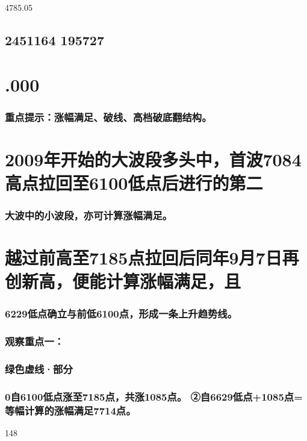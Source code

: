 \documentclass{article}
\begin{document}
4785.05

\subsection{2451164 195727}

\section{.000}

\subsubsection{重点提示：涨幅满足、破线、高档破底翻结构。}

\section{2009年开始的大波段多头中，首波7084高点拉回至6100低点后进行的第二}

\subsubsection{大波中的小波段，亦可计算涨幅满足。}

\section{越过前高至7185点拉回后同年9月7日再创新高，便能计算涨幅满足，且}

\subsubsection{6229低点确立与前低6100点，形成一条上升趋势线。}

\subsubsection{观察重点一：}

\subsubsection{绿色虚线·部分}

\subsubsection{0自6100低点涨至7185点，共涨1085点。 ②自6629低点+1085点=等幅计算的涨幅满足7714点。}

148
\end{document}
